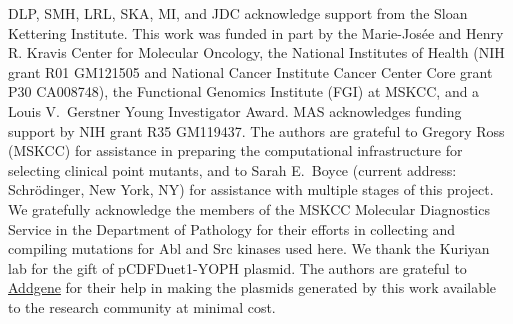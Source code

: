 \documentclass[phd,tocprelim]{cornell}
\begin{document}
DLP, SMH, LRL, SKA, MI, and JDC acknowledge support from the Sloan Kettering Institute.
This work was funded in part by the Marie-Josée and Henry R. Kravis Center for Molecular Oncology, the National Institutes of Health (NIH grant R01 GM121505 and National Cancer Institute Cancer Center Core grant P30 CA008748), the Functional Genomics Institute (FGI) at MSKCC, and a Louis V.~Gerstner Young Investigator Award. 
MAS acknowledges funding support by NIH grant R35 GM119437. 
The authors are grateful to Gregory Ross (MSKCC) for assistance in preparing the computational infrastructure for selecting clinical point mutants, and to Sarah E.~Boyce (current address: Schr\"{o}dinger, New York, NY) for assistance with multiple stages of this project.
We gratefully acknowledge the members of the MSKCC Molecular Diagnostics Service in the Department of Pathology for their efforts in collecting and compiling mutations for Abl and Src kinases used here.
We thank the Kuriyan lab for the gift of pCDFDuet1-YOPH plasmid.
The authors are grateful to \href{http://www.addgene.org}{Addgene} for their help in making the plasmids generated by this work available to the research community at minimal cost.



\end{document}

